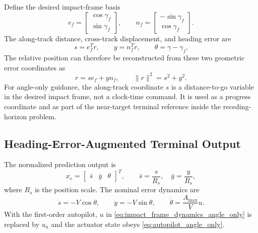 \documentclass[letterpaper,journal]{IEEEtran}
\begin{document}
Define the desired impact-frame basis
\begin{equation}
    e_f=\begin{bmatrix}\cos\gamma_f\\ \sin\gamma_f\end{bmatrix},\qquad
    n_f=\begin{bmatrix}-\sin\gamma_f\\ \cos\gamma_f\end{bmatrix}.
\end{equation}
The along-track distance, cross-track displacement, and heading error are
\begin{equation}
    s=e_f^Tr,\qquad y=n_f^Tr,\qquad \theta=\gamma-\gamma_f .
\end{equation}
The relative position can therefore be reconstructed from these two geometric error coordinates as
\begin{equation}
    r=se_f+yn_f,\qquad
    \|r\|^2=s^2+y^2 .
    \label{eq:r_sy_angle_only}
\end{equation}
For angle-only guidance, the along-track coordinate $s$ is a distance-to-go variable in the desired impact frame, not a clock-time command. It is used as a progress coordinate and as part of the near-target terminal reference inside the receding-horizon problem.

\subsection{Heading-Error-Augmented Terminal Output}
The normalized prediction output is
\begin{equation}
    x_e=
    \begin{bmatrix}
    \bar s&\bar y&\theta
    \end{bmatrix}^T,
    \qquad
    \bar s=\frac{s}{R_s},\quad \bar y=\frac{y}{R_s},
    \label{eq:xe_angle_only}
\end{equation}
where $R_s$ is the position scale. The nominal error dynamics are
\begin{equation}
    \dot s=-V\cos\theta,\qquad
    \dot y=-V\sin\theta,\qquad
    \dot\theta=\frac{A_{\max}}{V}u .
    \label{eq:impact_frame_dynamics_angle_only}
\end{equation}
With the first-order autopilot, $u$ in \eqref{eq:impact_frame_dynamics_angle_only} is replaced by $u_a$ and the actuator state obeys \eqref{eq:autopilot_angle_only}.
\end{document}
